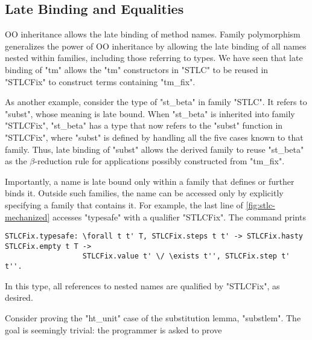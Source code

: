 \subsection{Late Binding and Equalities}
\label{sec:latebind}


OO inheritance allows the late binding of method names.
Family polymorphism generalizes the power of OO inheritance by allowing the
late binding of all names nested within families, including those referring to types.
We have seen that late binding of "tm" allows the "tm" constructors in "STLC"
to be reused in "STLCFix" to construct terms containing "tm_fix".

As another example, consider the type of "st_beta" in family "STLC".
It refers to "subst", whose meaning is late bound.
When "st_beta" is inherited into family "STLCFix", "st_beta" has a type that now
refers to the "subst" function in "STLCFix", where "subst" is defined
by handling all the five cases known to that family.
Thus, late binding of "subst" allows the derived family to reuse "st_beta"
as the $\beta$-reduction rule for applications possibly constructed from "tm_fix".

Importantly, a name is late bound only within a family that defines or further binds it.
Outside such families, the name can be accessed only by explicitly
specifying a family that contains it.
For example, the last line of \cref{fig:stlc-mechanized} accesses "typesafe"
with a qualifier "STLCFix".
The command prints

\begin{centered}
\begin{minipage}{.880\textwidth}
\begin{lstlisting}[basicstyle=\fontsize{8.25}{9}\ttfamily]
STLCFix.typesafe: \forall t t' T, STLCFix.steps t t' -> STLCFix.hasty STLCFix.empty t T ->
                  STLCFix.value t' \/ \exists t'', STLCFix.step t' t''.
\end{lstlisting}
\end{minipage}
\end{centered}

\noindent
In this type, all references to nested names are qualified by "STLCFix", as desired.



Consider proving the "ht_unit" case of the substitution lemma, "substlem".
The goal is seemingly trivial: the programmer is asked to prove

